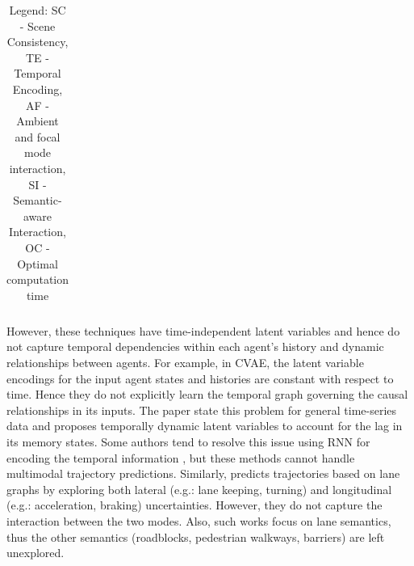 \documentclass{article}
\begin{document}
\begin{table}
\begin{center}
\begin{tabular}{cccccc}
\end{tabular}
\end{center}
\caption{Legend: SC - Scene Consistency, TE - Temporal Encoding, AF - Ambient and focal mode interaction, SI - Semantic-aware Interaction, OC - Optimal computation time}
\vspace{-0.2in} \label{table1}\end{table}
However, these techniques have time-independent latent variables and hence do not capture temporal dependencies within each agent's history and dynamic relationships between agents. For example, in CVAE, the latent variable encodings for the input agent states and histories are constant with respect to time. Hence they do not explicitly learn the temporal graph governing the causal relationships in its inputs. The paper \cite{7796911} \cite{girgis2022latent} state this problem for general time-series data and proposes temporally dynamic latent variables to account for the lag in its memory states.  Some authors tend to resolve this issue using RNN for encoding the temporal information \cite{jain2016structuralrnn} \cite{jia2022towards}, but these methods cannot handle multimodal trajectory predictions. Similarly, \cite{lanegraph} predicts trajectories based on lane graphs by exploring both lateral (e.g.: lane keeping, turning) and longitudinal (e.g.: acceleration, braking) uncertainties. However, they do not capture the interaction between the two modes. Also, such works \cite{laformer} focus on lane semantics, thus the other semantics (roadblocks, pedestrian walkways, barriers) are left unexplored.
\end{document}
